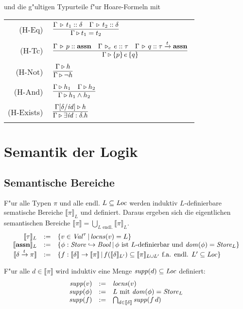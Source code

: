 \documentclass[12pt,a4paper,bigheadings]{scrartcl}
\newcommand{\semantic}[1]{\ensuremath{\llbracket#1\rrbracket}}
\newcommand{\assn}{\ensuremath{\mathbf{assn}}}
\newcommand{\locns}{\name{locns}}
\newcommand{\supp}{\name{supp}}
\newcommand{\tto}{\ensuremath{\xrightarrow{t}}}
\newcommand{\RN}[1]{\mbox{{\sc (#1)}}}
\newcommand{\Tje}[3]{#1 \,\tr_e\, #2\cc#3}
\begin{document}
und die g"ultigen Typurteile f"ur Hoare-Formeln mit \\[3mm]
\begin{tabular}{rl}
  \RN{H-Eq} & $\regel{\Tj{\Gamma}{t_1}{\delta} \quad \Tj{\Gamma}{t_2}{\delta}}
                     {\Tjh{\Gamma}{t_1 = t_2}}$ \\[1mm]
  \RN{H-Tc} & $\regel{\Tj{\Gamma}{p}{\assn} \quad \Tje{\Gamma}{e}{\tau} \quad \Tj{\Gamma}{q}{\tau} \tto \assn}
                     {\Tjh{\Gamma}{\triple{p}{e}{q}}}$ \\[1mm]
  \RN{H-Not} & $\regel{\Tjh{\Gamma}{h}}
                      {\Tjh{\Gamma}{\neg h}}$ \\[1mm]
  \RN{H-And} & $\regel{\Tjh{\Gamma}{h_1} \quad \Tjh{\Gamma}{h_2}}
                      {\Tjh{\Gamma}{h_1 \wedge h_2}}$ \\[1mm]
  \RN{H-Exists} & $\regel{\Tjh{\Gamma[\delta/\id]}{h}}
                         {\Tjh{\Gamma}{\exists \id:\delta.h}}$
\end{tabular}


\section{Semantik der Logik}

\subsection{Semantische Bereiche}

F"ur alle Typen $\pi$ und alle endl. $L \subseteq {\text{\it Loc\/}}$ werden induktiv $L$-definierbare
sematische Bereiche $\semantic{\pi}_L$ und definiert. Daraus ergeben sich die eigentlichen
semantischen Bereiche $\semantic{\pi} = \bigcup\limits_{L \text{ endl.}} \semantic{\pi}_L$.
\[\begin{array}{rcl}
  \semantic{\tau}_L &:=& \{v \in \Val^\tau\,|\,\locns(v) = L\} \\
  \semantic{\assn}_L &:=& \{\phi:\Store\pto\Bool\,|\,\text{$\phi$ ist $L$-definierbar und $\dom{\phi} = \Store_L$}\} \\
  \semantic{\delta \tto \pi} &:=& \{f:\semantic{\delta}\to\semantic{\pi}\,|\,
                                       \text{$f(\semantic{\delta}_{L'}) \subseteq \semantic{\pi}_{L\cup L'}$ f.a. endl. $L'\subseteq\Loc$}\}
\end{array}\]

\begin{definition}[Support]
  F"ur alle $d \in \semantic{\pi}$ wird induktiv eine Menge $\supp(d) \subseteq \Loc$ definiert:
  \[\begin{array}{rcl}
    \supp(v) &:=& \locns(v) \\
    \supp(\phi) &:=& L \text{ mit } \dom{\phi} = \Store_L \\
    \supp(f) &:=& \bigcap_{d\in\semantic{\delta}} \supp(f\,d)
  \end{array}\]
\end{definition}
\end{document}
